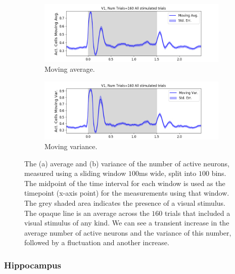 \documentclass[a4paper,12pt]{article}
\theoremstyle{definition}
\begin{document}
    \begin{figure}[h]
      \begin{subfigure}[h]{\linewidth}
        \includegraphics[width=\linewidth]{figures/v1_1ms_moving_avg_all_stimulated_trials.png}
        \caption{Moving average.}
        \label{fig:v1_moving_avg_num_active_cells}
      \end{subfigure}
      \begin{subfigure}[h]{\linewidth}
        \includegraphics[width=\linewidth]{figures/v1_1ms_moving_var_all_stimulated_trials.png}
        \caption{Moving variance.}
        \label{fig:v1_moving_var_num_active_cells}
      \end{subfigure}
      \caption{The (a) average and (b) variance of the number of active neurons, measured using a sliding window $100$ms wide, split into $100$ bins. The midpoint of the time interval for each window is used as the timepoint (x-axis point) for the measurements using that window. The grey shaded area indicates the presence of a visual stimulus. The opaque line is an average across the $160$ trials that included a visual stimulus of any kind. We can see a transient increase in the average number of active neurons and the variance of this number, followed by a fluctuation and another increase.}
      \label{fig:v1_moving_avg_and_var}
    \end{figure}

    \newpage

    \subsubsection{Hippocampus}
\end{document}
